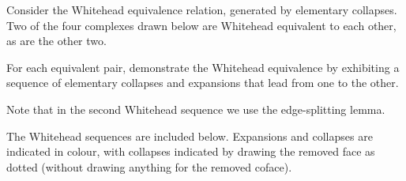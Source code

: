 \documentclass[12 pt, letterpaper]{hmcpset}
\begin{document}
\pagebreak

\begin{problem}[58.]
	Consider the Whitehead equivalence relation, generated by elementary collapses. Two of the four complexes drawn below are Whitehead equivalent to each other, as are the other two.

	For each equivalent pair, demonstrate the Whitehead equivalence by exhibiting a sequence of elementary collapses and expansions that lead from one to the other.

	Note that in the second Whitehead sequence we use the edge-splitting lemma.
\end{problem}

\begin{solution}
	The Whitehead sequences are included below. Expansions and collapses are indicated in colour, with collapses indicated by drawing the removed face as dotted (without drawing anything for the removed coface).
	
	
\end{solution}
\end{document}

